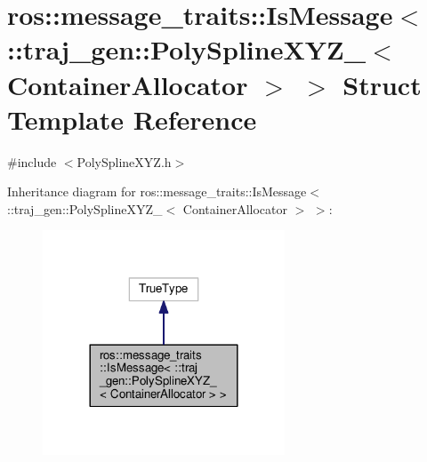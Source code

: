 \hypertarget{structros_1_1message__traits_1_1_is_message_3_01_1_1traj__gen_1_1_poly_spline_x_y_z___3_01_container_allocator_01_4_01_4}{}\section{ros\+:\+:message\+\_\+traits\+:\+:Is\+Message$<$ \+:\+:traj\+\_\+gen\+:\+:Poly\+Spline\+X\+Y\+Z\+\_\+$<$ Container\+Allocator $>$ $>$ Struct Template Reference}
\label{structros_1_1message__traits_1_1_is_message_3_01_1_1traj__gen_1_1_poly_spline_x_y_z___3_01_container_allocator_01_4_01_4}


{\ttfamily \#include $<$Poly\+Spline\+X\+Y\+Z.\+h$>$}



Inheritance diagram for ros\+:\+:message\+\_\+traits\+:\+:Is\+Message$<$ \+:\+:traj\+\_\+gen\+:\+:Poly\+Spline\+X\+Y\+Z\+\_\+$<$ Container\+Allocator $>$ $>$\+:
\nopagebreak
\begin{figure}[H]
\begin{center}
\leavevmode
\includegraphics[width=204pt]{structros_1_1message__traits_1_1_is_message_3_01_1_1traj__gen_1_1_poly_spline_x_y_z___3_01_contaf7ebb2e7163bc8b34722755ab8bbecf0}
\end{center}
\end{figure}


